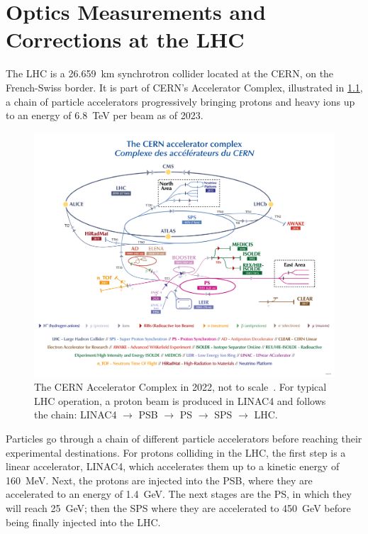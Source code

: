 \chapter{Optics Measurements and Corrections at the LHC}
\label{chapter:lhc_omc}

The \gls{LHC} is a \qty{26.659}{\kilo\metre} synchrotron collider located at the \gls{CERN}, on the French-Swiss border.
It is part of \gls{CERN}'s Accelerator Complex, illustrated in \cref{figure:cern_accelerator_complex}, a chain of particle accelerators progressively bringing protons and heavy ions up to an energy of \qty{6.8}{\tera\electronvolt} per beam as of \num{2023}.

\begin{figure}[!htb]
  \centering
  \includegraphics*[width=0.9\linewidth]{Figures/Optics_Measurements_Corrections_at_LHC/cern_accelerator_complex.png}
  \caption{The CERN Accelerator Complex in \num{2022}, not to scale~\cite{Website:CERN_Accelerator_Complex_Resource}. For typical LHC operation, a proton beam is produced in LINAC\num{4} and follows the chain: LINAC\num{4} \(\rightarrow\) PSB \(\rightarrow\) PS \(\rightarrow\) SPS \(\rightarrow\) LHC.}
  \label{figure:cern_accelerator_complex}
\end{figure}

Particles go through a chain of different particle accelerators before reaching their experimental destinations.
For protons colliding in the \gls{LHC}, the first step is a linear accelerator, \acrshort{LINAC}\num{4}, which accelerates them up to a kinetic energy of \qty{160}{\mega\electronvolt}.
Next, the protons are injected into the \gls{PSB}, where they are accelerated to an energy of \qty{1.4}{\giga\electronvolt}.
The next stages are the \gls{PS}, in which they will reach \qty{25}{\giga\electronvolt}; then the \gls{SPS} where they are accelerated to \qty{450}{\giga\electronvolt} before being finally injected into the \gls{LHC}.


